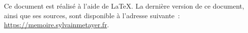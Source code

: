 
Ce document est réalisé à l'aide de \LaTeX. La dernière version de ce document, ainsi que ses sources, sont disponible à l'adresse suivante : \url{https://memoire.sylvainmetayer.fr}.
